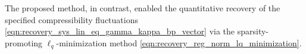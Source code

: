 The proposed method, in contrast, enabled
the quantitative recovery of
the specified compressibility fluctuations
\eqref{eqn:recovery_sys_lin_eq_gamma_kappa_bp_vector} via
the sparsity-promoting $\ell_{q}$-minimization method
\eqref{eqn:recovery_reg_norm_lq_minimization}.
